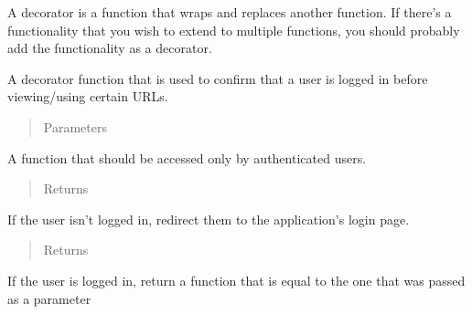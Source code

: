 \documentclass[letterpaper,10pt,english]{sphinxmanual}
\begin{document}
A decorator is a function that wraps and replaces another function. If there’s 
a functionality that you wish to extend to multiple functions, you should 
probably add the functionality as a decorator.


\begin{fulllineitems}
\label{\detokenize{tiger_leagues/readme:tiger_leagues.decorators.login_required}}
A decorator function that is used to confirm that a user is logged in before 
viewing/using certain URLs.

\begin{quote}\begin{description}
\item[{Parameters}] \leavevmode
{} \textendash{} 

\end{description}\end{quote}

A function that should be accessed only by authenticated users.
\begin{quote}\begin{description}
\item[{Returns}] \leavevmode
{}

\end{description}\end{quote}

If the user isn’t logged in, redirect them to the application’s login page.
\begin{quote}\begin{description}
\item[{Returns}] \leavevmode
{}

\end{description}\end{quote}

If the user is logged in, return a function that is equal to the one 
that was passed as a parameter

\end{fulllineitems}
\end{document}
